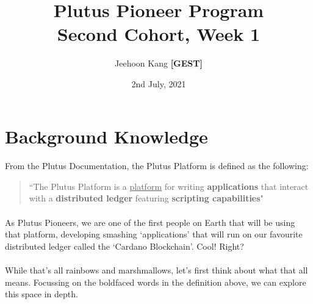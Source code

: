\documentclass[a4paper, 11pt]{article}
\title{Plutus Pioneer Program \\ \large Second Cohort, Week 1}
\date{2nd July, 2021}
\author{Jeehoon Kang \textbf{[GEST]}}
\begin{document}
    \maketitle

    \section{Background Knowledge}

    \paragraph{} From the Plutus Documentation, the Plutus Platform is defined as the following: 

    \begin{quotation}
        ``The Plutus Platform is a \underline{platform} for writing \textbf{applications} that interact with a \textbf{distributed ledger} featuring \textbf{scripting capabilities}"
    \end{quotation}

    \paragraph{}As Plutus Pioneers, we are one of the first people on Earth that will be using that platform, developing smashing `applications' that will run on our favourite distributed ledger called the `Cardano Blockchain'. Cool! Right?
    
    \paragraph{} While that's all rainbows and marshmallows, let's first think about what that all means. Focussing on the boldfaced words in the definition above, we can explore this space in depth.
\end{document}
